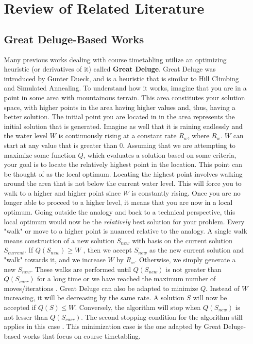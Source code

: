 \chapter{Review of Related Literature} \label{sec:rrl-title}
\section{Great Deluge-Based Works}
Many previous works dealing with course timetabling utilize an optimizing heuristic (or derivatives of it) called \textbf{Great Deluge}. Great Deluge was introduced by Gunter Dueck, and is a heuristic that is similar to Hill Climbing and Simulated Annealing. To understand how it works, imagine that you are in a point in some area with mountainous terrain. This area constitutes your solution space, with higher points in the area having higher values and, thus, having a better solution. The initial point you are located in in the area represents the initial solution that is generated. Imagine as well that it is raining endlessly and the water level $W$ is continuously rising at a constant rate $R_{w}$, where $R_{w}$. $W$ can start at any value that is greater than $0$. Assuming that we are attempting to maximize some function $Q$, which evaluates a solution based on some criteria, your goal is to locate the relatively highest point in the location. This point can be thought of as the local optimum. Locating the highest point involves walking around the area that is not below the current water level. This will force you to walk to a higher and higher point since $W$ is constantly rising. Once you are no longer able to proceed to a higher level, it means that you are now in a local optimum. Going outside the analogy and back to a technical perspective, this local optimum would now be the \textit{relatively} best solution for your problem. Every "walk" or move to a higher point is nuanced relative to the analogy. A single walk means construction of a new solution $S_{new}$ with basis on the current solution $S_{current}$. If $Q(S_{new}) \geq W$ \cite{gd-burke}, then we accept $S_{new}$ as the new current solution and "walk" towards it, and we increase $W$ by $R_{w}$. Otherwise, we simply generate a new $S_{new}$. These walks are performed until $Q(S_{new})$ is not greater than $Q(S_{curr})$ for a long time or we have reached the maximum number of moves/iterations \cite{intro-gd-dueck}. Great Deluge can also be adapted to minimize $Q$. Instead of $W$ increasing, it will be decreasing by the same rate. A solution $S$ will now be accepted if $Q(S) \leq W$. Conversely, the algorithm will stop when $Q(S_{new})$ is not lesser than $Q(S_{curr})$. The second stopping condition for the algorithm still applies in this case \cite{gd-burke}\cite{nlgd-landa-silva}\cite{nlgdrl-obit}. This minimization case is the one adapted by Great Deluge-based works that focus on course timetabling.

